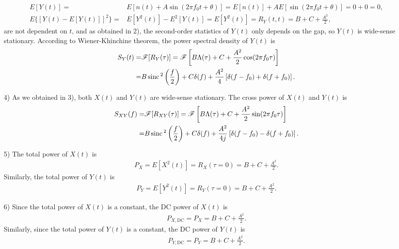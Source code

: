 \documentclass{assignment}
\begin{document}
\begin{sol}
\begin{itemize}
        \begin{align}
            E[Y(t)]=&E[n(t)+A\sin(2\pi f_0t+\theta)]=E[n(t)]+AE[\sin(2\pi f_0t+\theta)]=0+0=0,\\
            E\{[Y(t)-E[Y(t)]]^2\}=&E[Y^2(t)]-E^2[Y(t)]=E[Y^2(t)]=R_Y(t,t)=B+C+\frac{A^2}{2},
        \end{align}
        are not dependent on $t$, and as obtained in 2), the second-order statistics of $Y(t)$ only depends on the gap, so $Y(t)$ is wide-sense stationary. According to Wiener-Khinchine theorem, the power spectral density of $Y(t)$ is
        \begin{align}
            \notag S_Y(t)=&\mathscr{F}[R_Y(\tau)]=\mathscr{F}\left[B\Lambda(\tau)+C+\frac{A^2}{2}\cos(2\pi f_0\tau)\right]\\
            =&B\,\text{sinc}\,^2\left(\frac{f}{2}\right)+C\delta(f)+\frac{A^2}{4}\left[\delta(f-f_0)+\delta(f+f_0)\right].
        \end{align}
        \item[4)] As we obtained in 3), both $X(t)$ and $Y(t)$ are wide-sense stationary. The cross power of $X(t)$ and $Y(t)$ is
        \begin{align}
            \notag S_{XY}(f)=&\mathscr{F}[R_{XY}(\tau)]=\mathscr{F}\left[B\Lambda(\tau)+C+\frac{A^2}{2}\sin(2\pi f_0\tau)\right]\\
            =&B\,\text{sinc}\,^2\left(\frac{f}{2}\right)+C\delta(f)+\frac{A^2}{4j}\left[\delta(f-f_0)-\delta(f+f_0)\right].
        \end{align}
        \item[5)] The total power of $X(t)$ is
        \begin{align}
            P_X=E[X^2(t)]=R_X(\tau=0)=B+C+\frac{A^2}{2}.
        \end{align}
        Similarly, the total power of $Y(t)$ is
        \begin{align}
            P_Y=E[Y^2(t)]=R_Y(\tau=0)=B+C+\frac{A^2}{2}.
        \end{align}
        \item[6)] Since the total power of $X(t)$ is a constant, the DC power of $X(t)$ is
        \begin{align}
            P_{X,\text{DC}}=P_X=B+C+\frac{A^2}{2}.
        \end{align}
        Similarly, since the total power of $Y(t)$ is a constant, the DC power of $Y(t)$ is
        \begin{align}
            P_{Y,\text{DC}}=P_Y=B+C+\frac{A^2}{2}.
        \end{align}
    \end{itemize}
\end{sol}
\end{document}
